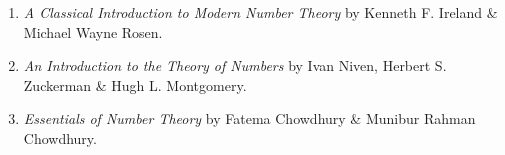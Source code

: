 \begin{enumerate}
    \item \textit{A Classical Introduction to Modern Number Theory} by Kenneth F. Ireland \& Michael Wayne Rosen.
    \item \textit{An Introduction to the Theory of Numbers} by Ivan Niven, Herbert S. Zuckerman \& Hugh L. Montgomery.
    \item \textit{Essentials of Number Theory} by Fatema Chowdhury \& Munibur Rahman Chowdhury.
\end{enumerate}
